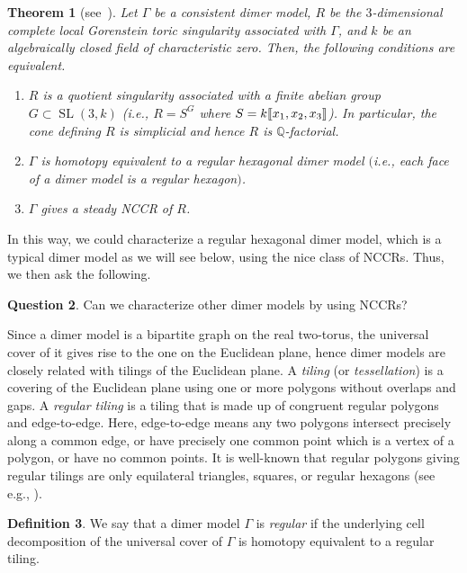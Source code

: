 \documentclass[11pt]{amsart}
\newtheorem{theo}{Theorem}[section]
\theoremstyle{definition}
\newtheorem{defi}[theo]{Definition}
\newtheorem{ques}[theo]{Question}
\newcommand{\QQ}{\mathbb{Q}}
\DeclareMathOperator{\SL}{SL}
\newcommand{\llbracket}{\mathopen{[\mkern -2.7mu[}}
\newcommand{\rrbracket}{\mathclose{]\mkern -2.7mu]}}
\begin{document}
\begin{theo}[{see~\cite[Corollary~1.7]{IN}}]\label{dimer}
Let $\Gamma$ be a consistent dimer model, $R$ be the $3$-dimensional complete local Gorenstein toric singularity associated with $\Gamma$, and $k$ be an algebraically closed field of characteristic zero. Then, the following conditions are equivalent.
\begin{enumerate}%
\item $R$ is a quotient singularity associated with a finite abelian group $G\subset\SL(3, k)$ (i.e., $R=S^G$ where $S=k\llbracket x_1,x_2, x_3\rrbracket $). In particular, the cone defining $R$ is simplicial and hence $R$ is $\QQ$-factorial.
\item $\Gamma$ is homotopy equivalent to a regular hexagonal dimer model $($i.e., each face of a dimer model is a regular hexagon$)$.
\item $\Gamma$ gives a steady NCCR of $R$.
\end{enumerate}
\end{theo}

In this way, we could characterize a regular hexagonal dimer model, which is a typical dimer model as we will see below, using the nice class of NCCRs. Thus, we then ask the following.

\begin{ques}\label{que_dimer}
Can we characterize other dimer models by using NCCRs?
\end{ques}

Since a dimer model is a bipartite graph on the real two-torus, the universal cover of it gives rise to the one on the Euclidean plane, hence dimer models are closely related with tilings of the Euclidean plane. A \emph{tiling} (or \emph{tessellation}) is a covering of the Euclidean plane using one or more polygons without overlaps and gaps. A \emph{regular tiling} is a tiling that is made up of congruent regular polygons and edge-to-edge. Here, edge-to-edge means any two polygons intersect precisely along a common edge, or have precisely one common point which is a vertex of a polygon, or have no common points. It is well-known that regular polygons giving regular tilings are only equilateral triangles, squares, or regular hexagons (see e.g., \cite{GS}).

\begin{defi}
We say that a dimer model $\Gamma$ is \emph{regular} if the underlying cell decomposition of the universal cover of $\Gamma$ is homotopy equivalent to a regular tiling.
\end{defi}
\end{document}
